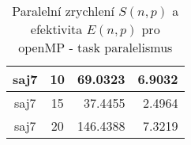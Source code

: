 \documentclass{article} \oddsidemargin=-5mm
\begin{document}
\begin{table}[h]
\begin{tabular}{|c|c|r|r|}
saj7              & 10                 & 69.0323                                                      & 6.9032                                                       \\ \hline
saj7              & 15                 & 37.4455                                                      & 2.4964                                                       \\ \hline
saj7              & 20                 & 146.4388                                                     & 7.3219                                                       \\ \hline
\end{tabular}
\caption{Paralelní zrychlení $S(n,p)$ a efektivita $E(n,p)$ pro openMP - task paralelismus}
\label{openMP-task-efectivity}
\end{table}
\end{document}
